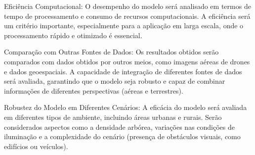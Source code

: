 \documentclass[
    12pt,                   %
    openright,              %
    oneside,                %
    a4paper,                %
    sumario=tradicional,    %
    english,                %
    brazil,                 %
    ]{abntex2}
\begin{document}
    Eficiência Computacional: O desempenho do modelo será analisado em termos de tempo de processamento e consumo de recursos computacionais. A eficiência será um critério importante, especialmente para a aplicação em larga escala, onde o processamento rápido e otimizado é essencial.
    
    Comparação com Outras Fontes de Dados: Os resultados obtidos serão comparados com dados obtidos por outros meios, como imagens aéreas de drones e dados geoespaciais. A capacidade de integração de diferentes fontes de dados será avaliada, garantindo que o modelo seja robusto e capaz de combinar informações de diferentes perspectivas (aéreas e terrestres).
    
    Robustez do Modelo em Diferentes Cenários: A eficácia do modelo será avaliada em diferentes tipos de ambiente, incluindo áreas urbanas e rurais. Serão considerados aspectos como a densidade arbórea, variações nas condições de iluminação e a complexidade do cenário (presença de obstáculos visuais, como edifícios ou veículos).



    
    
    
\end{document}
